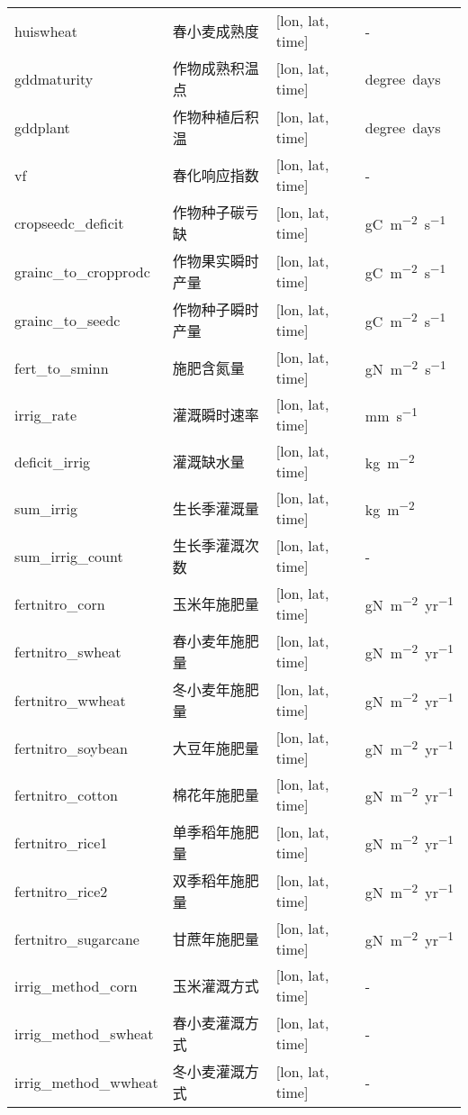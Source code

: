 {\begin{longtable}[htbp]{lp{}ll}
huiswheat & 春小麦成熟度 & {[}lon, lat, time{]} & - \\
gddmaturity & 作物成熟积温点 & {[}lon, lat, time{]} & \unit{degree.days} \\
gddplant & 作物种植后积温 & {[}lon, lat, time{]} & \unit{degree.days} \\
vf & 春化响应指数 & {[}lon, lat, time{]} & - \\
cropseedc\_deficit & 作物种子碳亏缺 & {[}lon, lat, time{]} & \unit{gC.m^{-2}.s^{-1}} \\
grainc\_to\_cropprodc & 作物果实瞬时产量 & {[}lon, lat, time{]} & \unit{gC.m^{-2}.s^{-1}} \\
grainc\_to\_seedc & 作物种子瞬时产量 & {[}lon, lat, time{]} & \unit{gC.m^{-2}.s^{-1}} \\
fert\_to\_sminn & 施肥含氮量 & {[}lon, lat, time{]} & \unit{gN.m^{-2}.s^{-1}} \\
irrig\_rate & 灌溉瞬时速率 & {[}lon, lat, time{]} & \unit{mm.s^{-1}} \\
deficit\_irrig & 灌溉缺水量 & {[}lon, lat, time{]} & \unit{kg.m^{-2}} \\
sum\_irrig & 生长季灌溉量 & {[}lon, lat, time{]} & \unit{kg.m^{-2}} \\
sum\_irrig\_count & 生长季灌溉次数 & {[}lon, lat, time{]} & - \\
fertnitro\_corn & 玉米年施肥量 & {[}lon, lat, time{]} & \unit{gN.m^{-2}.yr^{-1}} \\
fertnitro\_swheat & 春小麦年施肥量 & {[}lon, lat, time{]} & \unit{gN.m^{-2}.yr^{-1}} \\
fertnitro\_wwheat & 冬小麦年施肥量 & {[}lon, lat, time{]} & \unit{gN.m^{-2}.yr^{-1}} \\
fertnitro\_soybean & 大豆年施肥量 & {[}lon, lat, time{]} & \unit{gN.m^{-2}.yr^{-1}} \\
fertnitro\_cotton & 棉花年施肥量 & {[}lon, lat, time{]} & \unit{gN.m^{-2}.yr^{-1}} \\
fertnitro\_rice1 & 单季稻年施肥量 & {[}lon, lat, time{]} & \unit{gN.m^{-2}.yr^{-1}} \\
fertnitro\_rice2 & 双季稻年施肥量 & {[}lon, lat, time{]} & \unit{gN.m^{-2}.yr^{-1}} \\
fertnitro\_sugarcane & 甘蔗年施肥量 & {[}lon, lat, time{]} & \unit{gN.m^{-2}.yr^{-1}} \\
irrig\_method\_corn & 玉米灌溉方式 & {[}lon, lat, time{]} & - \\
irrig\_method\_swheat & 春小麦灌溉方式 & {[}lon, lat, time{]} & - \\
irrig\_method\_wwheat & 冬小麦灌溉方式 & {[}lon, lat, time{]} & - \\

\end{longtable}}
